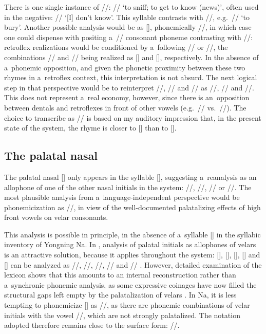 			There is one single instance of //: // ‘to sniff; to get to know (news)’, often
			used in the negative: // ‘[I] don’t know’. This syllable contrasts with //,
			e.g.~// ‘to bury’. Another possible analysis would be as [], phonemically //, in which case one could dispense with positing a~// consonant phoneme contrasting
			with //: retroflex realizations would be conditioned by a~following // or //,
			the combinations // and // being realized as [] and [],
			respectively. In the absence of a~phonemic opposition, and given the phonetic proximity between
			these two rhymes in a~retroflex context, this interpretation is not absurd. The next logical step in
			that perspective would be to reinterpret //, // and // as //,
			// and //. This does not represent a~real economy, however, since there is an~opposition between dentals
			and retroflexes in front of other vowels (e.g.~// vs.\ //). The choice to transcribe
			as // is based on my auditory impression that, in the present state of the system, the rhyme
			is closer to [] than to [].
			
			\subsection{The palatal nasal}
			\label{sec:palatalnasal}
			
			The palatal nasal [{\kern2pt}] only appears in the syllable [{\kern2pt}], suggesting a~reanalysis as an allophone of one of the other nasal initials in the system: //, //, // or //. The most plausible analysis from a~language-independent perspective would be phonemicization as //, in view of the well-documented palatalizing effects of high front vowels on velar consonants. 
			
			This analysis is possible in principle, in the absence of a~syllable [] in the syllabic inventory of Yongning Na. In , analysis of palatal initials as allophones of velars is an attractive solution, because it applies throughout the system: [], [], [{\kern2pt}], [{\kern2pt}] and [{\kern2pt}] can be analyzed as //, //, //, // and // \citep[14]{michailovskyetal2006}. However, detailed examination of the  lexicon shows that this amounts to an internal reconstruction rather than a~synchronic phonemic analysis, as some expressive coinages have now filled the structural gaps left empty by the palatalization of velars \citep[7]{michaudetal2015c}. In Na, it is less tempting to phonemicize [{\kern2pt}] as //, as there are phonemic combinations of velar initials with the vowel //, which are not strongly palatalized. The notation adopted therefore remains close to the surface form: /{\kern1pt}/.
			
